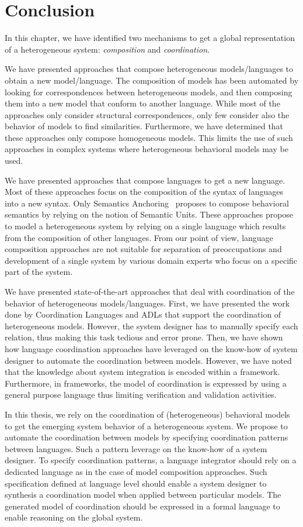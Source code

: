 \section{Conclusion}
In this chapter, we have identified two mechanisms to get a global representation of a heterogeneous system: \emph{composition} and \emph{coordination}. 

We have presented approaches that compose heterogeneous models/languages to obtain a new model/language. The composition of models has been automated by looking for correspondences between heterogeneous models, and then composing them into a new model that conform to another language. While most of the approaches only consider structural correspondences, only few consider also the behavior of models to find similarities. Furthermore, we have determined that these approaches only compose homogeneous models. This limits the use of such approaches in complex systems where heterogeneous behavioral models may be used. 

We have presented approaches that compose languages to get a new language. Most of these approaches focus on the composition of the syntax of languages into a new syntax. Only Semantics Anchoring~\cite{semanticsanchoring} proposes to compose behavioral semantics by relying on the notion of Semantic Units. These approaches propose to model a heterogeneous system by relying on a single language which results from the composition of other languages. From our point of view, language composition approaches are not suitable for separation of preoccupations and development of a single system by various domain experts who focus on a specific part of the system.

We have presented state-of-the-art approaches that deal with coordination of the behavior of heterogeneous models/languages. First, we have presented the work done by Coordination Languages and ADLs that support the coordination of heterogeneous models. However, the system designer has to manually specify each relation, thus making this task tedious and error prone. Then, we have shown how language coordination approaches have leveraged on the know-how of system designer to automate the coordination between models. However, we have noted that the knowledge about system integration is encoded within a framework. Furthermore, in frameworks, the model of coordination is expressed by using a general purpose language thus limiting verification and validation activities. 

In this thesis, we rely on the coordination of (heterogeneous) behavioral models to get the emerging system behavior of a heterogeneous system. We propose to automate the coordination between models by specifying coordination patterns between languages. Such a pattern leverage on the know-how of a system designer. To specify coordination patterns, a language integrator should rely on a dedicated language as in the case of model composition approaches. Such specification defined at language level should enable a system designer to synthesis a coordination model when applied between particular models. The generated model of coordination should be expressed in a formal language to enable reasoning on the global system. 

